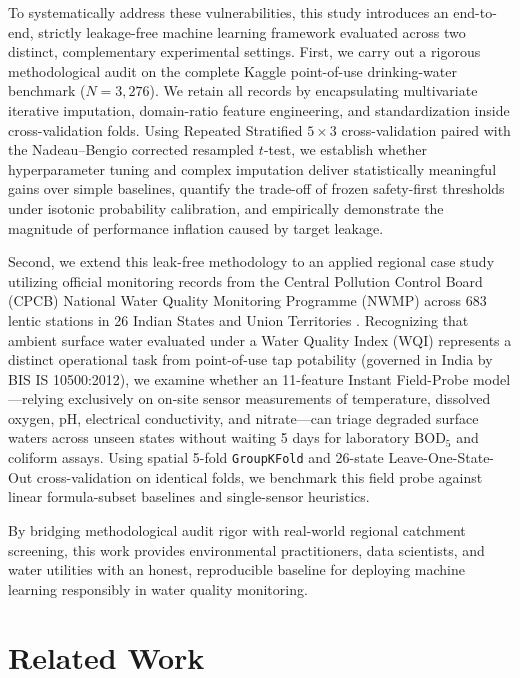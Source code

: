 \documentclass[pdflatex,sn-mathphys-num]{sn-jnl}%
\theoremstyle{thmstyleone}%
\theoremstyle{thmstyletwo}%
\theoremstyle{thmstylethree}%
\begin{document}
To systematically address these vulnerabilities, this study introduces an end-to-end, strictly leakage-free machine learning framework evaluated across two distinct, complementary experimental settings. First, we carry out a rigorous methodological audit on the complete Kaggle point-of-use drinking-water benchmark ($N = 3,276$). We retain all records by encapsulating multivariate iterative imputation, domain-ratio feature engineering, and standardization inside cross-validation folds. Using Repeated Stratified $5 \times 3$ cross-validation paired with the Nadeau--Bengio \cite{nadeau2003} corrected resampled $t$-test, we establish whether hyperparameter tuning and complex imputation deliver statistically meaningful gains over simple baselines, quantify the trade-off of frozen safety-first thresholds under isotonic probability calibration, and empirically demonstrate the magnitude of performance inflation caused by target leakage.

Second, we extend this leak-free methodology to an applied regional case study utilizing official monitoring records from the Central Pollution Control Board (CPCB) National Water Quality Monitoring Programme (NWMP) across 683 lentic stations in 26 Indian States and Union Territories \cite{cpcb2024}. Recognizing that ambient surface water evaluated under a Water Quality Index (WQI) represents a distinct operational task from point-of-use tap potability (governed in India by BIS IS 10500:2012), we examine whether an 11-feature Instant Field-Probe model---relying exclusively on on-site sensor measurements of temperature, dissolved oxygen, pH, electrical conductivity, and nitrate---can triage degraded surface waters across unseen states without waiting 5 days for laboratory $\text{BOD}_5$ and coliform assays. Using spatial 5-fold \texttt{GroupKFold} and 26-state Leave-One-State-Out cross-validation on identical folds, we benchmark this field probe against linear formula-subset baselines and single-sensor heuristics.

By bridging methodological audit rigor with real-world regional catchment screening, this work provides environmental practitioners, data scientists, and water utilities with an honest, reproducible baseline for deploying machine learning responsibly in water quality monitoring.

\section{Related Work}\label{sec2}
\end{document}
